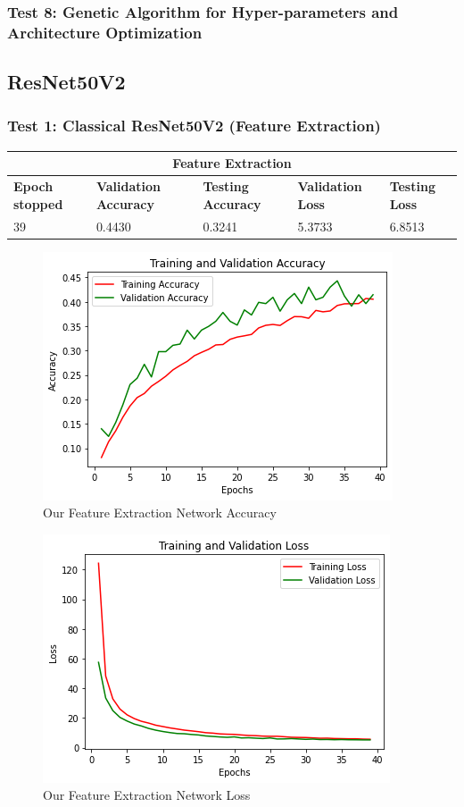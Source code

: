 \subsubsection{Test 8: Genetic Algorithm for Hyper-parameters and Architecture Optimization}





\subsection{ResNet50V2}


\subsubsection{Test 1: Classical ResNet50V2 (Feature Extraction)}

\begin{tabular}{ |p{2cm}|p{2cm}|p{2cm}|p{2cm}|p{2cm}|  }
\hline
\multicolumn{5}{|c|}{Feature Extraction} \\
\hline
\textbf{Epoch stopped} & \textbf{Validation Accuracy} & \textbf{Testing Accuracy} & \textbf{Validation Loss} & \textbf{Testing Loss} \\
\hline
39 & 0.4430 & 0.3241 & 5.3733 & 6.8513\\
\hline
\end{tabular}

\begin{figure}[H]
	\centering
	\includegraphics[height=0.45\textwidth]{img/resnet50v2/resnet50acc.png}
	\caption{Our Feature Extraction Network Accuracy}
	\label{fig:resnet50acc}
\end{figure}

\begin{figure}[H]
	\centering
	\includegraphics[height=0.45\textwidth]{img/resnet50v2/resnet50loss.png}
	\caption{Our Feature Extraction Network Loss}
	\label{fig:resnet50loss}
\end{figure}


